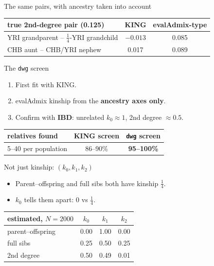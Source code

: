 \documentclass[11pt,aspectratio=169]{beamer}
\begin{document}
\begin{frame}{The same pairs, with ancestry taken into account}
\centering
\begin{tabular}{@{}lcc@{}}
\toprule
true 2nd-degree pair (0.125) & KING & evalAdmix-type \\
\midrule
YRI grandparent -- $\tfrac14$-YRI grandchild & \alert{$-0.013$} & 0.085 \\
CHB aunt -- CHB/YRI nephew & \alert{0.017} & 0.089 \\
\bottomrule
\end{tabular}
\end{frame}

\begin{frame}{The \texttt{dwg} screen}
\begin{enumerate}
  \item First fit with KING.
  \item evalAdmix kinship from the \textbf{ancestry axes only}.
  \item Confirm with \textbf{IBD}: unrelated $k_0\approx1$, 2nd degree $\approx0.5$.
\end{enumerate}
\vspace{6pt}
\centering
\begin{tabular}{@{}lcc@{}}
\toprule
relatives found & KING screen & \texttt{dwg} screen \\
\midrule
5--40 per population & 86--90\% & \textbf{95--100\%} \\
\bottomrule
\end{tabular}
\end{frame}

\begin{frame}{Not just kinship: $(k_0, k_1, k_2)$}
\begin{itemize}
  \item Parent--offspring and full sibs both have kinship $\tfrac14$.
  \item $k_0$ tells them apart: 0 vs $\tfrac14$.
\end{itemize}
\vspace{6pt}
\centering
\begin{tabular}{@{}lccc@{}}
\toprule
estimated, $N=2000$ & $k_0$ & $k_1$ & $k_2$ \\
\midrule
parent--offspring & 0.00 & 1.00 & 0.00 \\
full sibs & 0.25 & 0.50 & 0.25 \\
2nd degree & 0.50 & 0.49 & 0.01 \\
\bottomrule
\end{tabular}
\end{frame}
\end{document}
